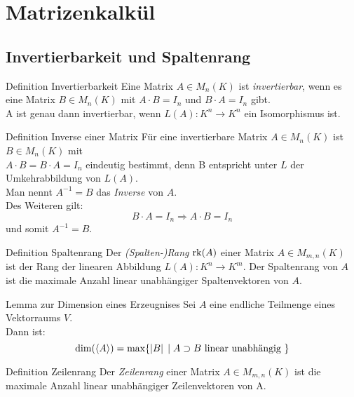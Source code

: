\documentclass[main.tex]{subfiles}
\begin{document}
\section*{Matrizenkalkül}
\subsection*{Invertierbarkeit und Spaltenrang}

\begin{karte}{Definition Invertierbarkeit}
    Eine Matrix \(A \in M_n(K)\) ist \textit{invertierbar},
    wenn es eine Matrix \(B \in M_n(K)\) mit \(A \cdot B = I_n\) 
    und \(B \cdot A = I_n\) gibt.\\
    A ist genau dann invertierbar, wenn \(L(A): K^n \rightarrow K^n \)
    ein Isomorphismus ist.
\end{karte}
\begin{karte}{Definition Inverse einer Matrix}
    Für eine invertierbare Matrix \(A \in M_n(K)\) ist \(B \in M_n(K)\) 
    mit \\
     \(A \cdot B = B \cdot A = I_n\)
    eindeutig bestimmt, denn B entspricht unter \(L\) 
    der Umkehrabbildung von \(L(A)\). \\
    Man nennt \(A^{-1} = B\) das \textit{Inverse} von \(A\).\\
    Des Weiteren gilt: 
    \[B \cdot A = I_n \Rightarrow A \cdot B = I_n\] 
    und somit \(A^{-1} = B\).
\end{karte}
\begin{karte}{Definition Spaltenrang}
    Der \textit{(Spalten-)Rang} \(\operatorname{rk}(A)\) einer Matrix
    \(A \in M_{m,n}(K)\) ist der Rang der linearen Abbildung 
    \(L(A): K^n \rightarrow K^m\).
    Der Spaltenrang von \(A\) ist die maximale Anzahl linear unabhängiger 
    Spaltenvektoren von \(A\).
\end{karte}
\begin{karte}{Lemma zur Dimension eines Erzeugnises}
    Sei \(A\) eine endliche Teilmenge eines Vektorraums \(V\). \\
    Dann ist: 
    \[\dim(\langle A \rangle) = \text{max}\{\left| B \right| \;\vert\; 
    A \supset B \text{ linear unabhängig }\}\]
\end{karte}
\begin{karte}{Definition Zeilenrang}
    Der \textit{Zeilenrang} einer Matrix \(A \in M_{m,n}(K)\) ist 
    die maximale Anzahl linear unabhängiger Zeilenvektoren von A.
\end{karte}
\end{document}
